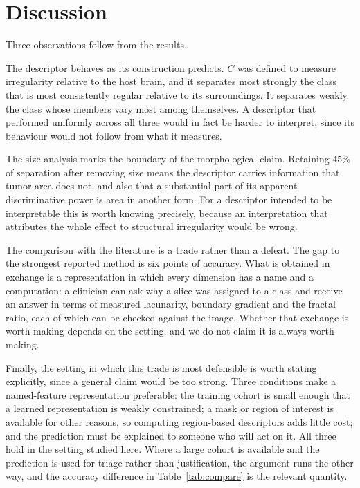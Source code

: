 \documentclass[journal]{IEEEtran}
\begin{document}
\section{Discussion}

Three observations follow from the results.

The descriptor behaves as its construction predicts. $C$ was defined to measure
irregularity relative to the host brain, and it separates most strongly the class
that is most consistently regular relative to its surroundings. It separates
weakly the class whose members vary most among themselves. A descriptor that
performed uniformly across all three would in fact be harder to interpret, since
its behaviour would not follow from what it measures.

The size analysis marks the boundary of the morphological claim. Retaining $45\%$
of separation after removing size means the descriptor carries information that
tumor area does not, and also that a substantial part of its apparent
discriminative power is area in another form. For a descriptor intended to be
interpretable this is worth knowing precisely, because an interpretation that
attributes the whole effect to structural irregularity would be wrong.

The comparison with the literature is a trade rather than a defeat. The gap to
the strongest reported method is six points of accuracy. What is obtained in
exchange is a representation in which every dimension has a name and a
computation: a clinician can ask why a slice was assigned to a class and receive
an answer in terms of measured lacunarity, boundary gradient and the fractal
ratio, each of which can be checked against the image. Whether that exchange is
worth making depends on the setting, and we do not claim it is always worth
making.

Finally, the setting in which this trade is most defensible is worth stating
explicitly, since a general claim would be too strong. Three conditions make a
named-feature representation preferable: the training cohort is small enough that
a learned representation is weakly constrained; a mask or region of interest is
available for other reasons, so computing region-based descriptors adds little
cost; and the prediction must be explained to someone who will act on it. All
three hold in the setting studied here. Where a large cohort is available and the
prediction is used for triage rather than justification, the argument runs the
other way, and the accuracy difference in Table~\ref{tab:compare} is the relevant
quantity.
\end{document}

